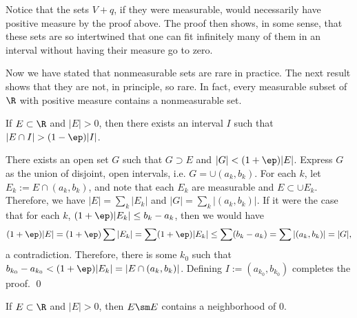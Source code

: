 Notice that the sets $V+q$, if they were measurable, would necessarily have positive measure by the proof above. The proof then shows, in some sense, that these sets are so intertwined that one can fit infinitely many of them in an interval without having their measure go to zero. 


Now we have stated that nonmeasurable sets are rare in practice. The next result shows that they are not, in principle, so rare. In fact, every measurable subset of $\R$ with positive measure contains a nonmeasurable set. 























\begin{lem} \label{lem:density}
If $E \subset \R$ and $|E|>0$, then there exists an interval $I$ such that $|E \cap I|> (1-\ep) |I|$. 
\end{lem}

\pf There exists an open set $G$ such that $G \supset E$ and $|G|< (1+\ep) |E|$. Express $G$ as the union of disjoint, open intervals, i.e. $G= \cup (a_k,b_k)$. For each $k$, let $E_k:= E \cap (a_k,b_k)$, and note that each $E_k$ are measurable and $E \subset  \cup E_k$. Therefore, we have $|E|= \sum_k |E_k|$ and $|G|= \sum_k |(a_k,b_k)|$. If it were the case that for each $k$, $(1+\ep)|E_k| \leq b_k-a_k$, then we would have 
	\[
	(1+\ep)|E|= (1+\ep)\sum |E_k|= \sum (1+\ep)|E_k| \leq \sum (b_k-a_k)= \sum |(a_k,b_k)|= |G|, 
	\]
a contradiction. Therefore, there is some $k_0$ such that $b_{k_0} - a_{k_0} < (1+\ep) |E_k|= |E \cap (a_k,b_k)|$. Defining $I:= (a_{k_0},b_{k_0})$ completes the proof. \qed \\







\begin{lem} \label{lem:subzero}
If $E \subset \R$ and $|E|>0$, then $E \sm E$ contains a neighborhood of 0. 
\end{lem}


